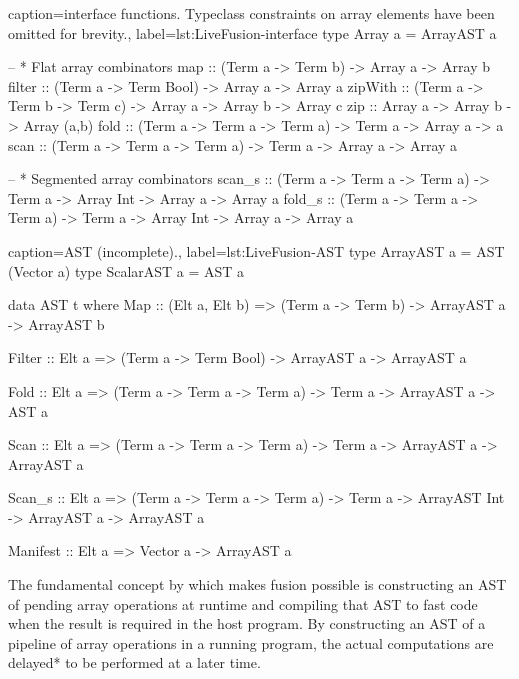 \documentclass[preamble.tex]{subfiles}
\begin{document}
\begin{hscode2}{%
    caption={\LiveFusion interface functions. Typeclass constraints on array elements have been omitted for brevity.},%
    label=lst:LiveFusion-interface}
type Array a = ArrayAST a

-- * Flat array combinators
map      :: (Term a -> Term b) -> Array a -> Array b
filter   :: (Term a -> Term Bool) -> Array a -> Array a
zipWith  :: (Term a -> Term b -> Term c) -> Array a -> Array b -> Array c
zip      :: Array a -> Array b -> Array (a,b)
fold     :: (Term a -> Term a -> Term a) -> Term a -> Array a -> a
scan     :: (Term a -> Term a -> Term a) -> Term a -> Array a -> Array a

-- * Segmented array combinators
scan_s   :: (Term a -> Term a -> Term a) -> Term a
         -> Array Int -> Array a -> Array a
fold_s   :: (Term a -> Term a -> Term a) -> Term a
         -> Array Int -> Array a -> Array a
\end{hscode2}


\begin{hscode2}{%
    caption={\LiveFusion AST (incomplete).},%
    label=lst:LiveFusion-AST}
type ArrayAST a = AST (Vector a)
type ScalarAST a = AST a

data AST t where
  Map      :: (Elt a, Elt b)
           => (Term a -> Term b)
           -> ArrayAST a
           -> ArrayAST b

  Filter   :: Elt a
           => (Term a -> Term Bool)
           -> ArrayAST a
           -> ArrayAST a

  Fold     :: Elt a
           => (Term a -> Term a -> Term a)
           -> Term a
           -> ArrayAST a
           -> AST a

  Scan     :: Elt a
           => (Term a -> Term a -> Term a)
           -> Term a
           -> ArrayAST a
           -> ArrayAST a

  Scan_s   :: Elt a
           => (Term a -> Term a -> Term a)
           -> Term a
           -> ArrayAST Int
           -> ArrayAST a
           -> ArrayAST a

  Manifest :: Elt a
           => Vector a
           -> ArrayAST a
\end{hscode2}

The fundamental concept by which \LiveFusion makes fusion possible is constructing an AST\iast{} of pending array operations at runtime and compiling that AST to fast code when the result is required in the host program. By constructing an AST of a pipeline of array operations in a running program, the actual computations are \*delayed* to be performed at a later time.
\end{document}
